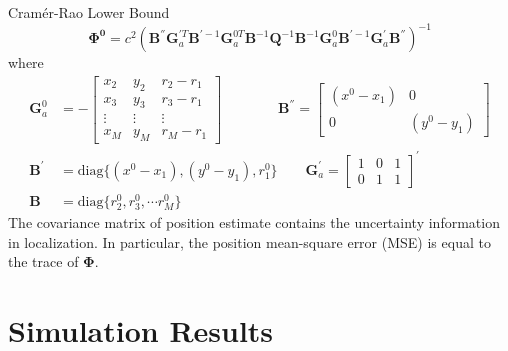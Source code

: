 \documentclass[10pt]{beamer}
\begin{document}
\begin{frame}{Cram\'{e}r-Rao Lower Bound}
  \begin{equation*}
    \boldsymbol{\Phi^0} = c^2 ( \textbf{B}^{''} \textbf{G}_a^{'T} \textbf{B}^{'-1} \textbf{G}_a^{0T} \textbf{B}^{-1} \textbf{Q}^{-1} \textbf{B}^{-1} \textbf{G}_a^{0}  \textbf{B}^{'-1} \textbf{G}_a^{'} \textbf{B}^{''} )^{-1}
  \end{equation*}
  where
  \begin{align*}
     \textbf{G}_a^0   &= - \begin{bmatrix} x_2  & y_2 & r_2-r_1 \\   x_3  & y_3 & r_3-r_1 \\ \vdots & \vdots & \vdots \\  x_M  & y_M & r_M-r_1 \end{bmatrix} \qquad \qquad
     \textbf{B}^{''}  = \begin{bmatrix} (x^0 - x_1) & 0 \\  0 & (y^0 - y_1)\end{bmatrix}\\
     \textbf{B}^{'}\  &= \text{diag}\{(x^0 - x_1),(y^0 - y_1),r_1^0\}\qquad
     \textbf{G}_a^{'} = \begin{bmatrix} 1 & 0 & 1 \\  0 & 1 & 1\end{bmatrix}^{'} \\
     \textbf{B}  \ \  &= \text{diag}\{r_2^0, r_3^0, \cdots r_M^0\}
   \end{align*}
   The covariance matrix of position estimate contains the uncertainty information in localization.
   In particular, the position mean-square error (\textsc{MSE}) is equal to the \alert{trace} of $\boldsymbol{\Phi}$.
\end{frame}

\section{Simulation Results}
\end{document}
